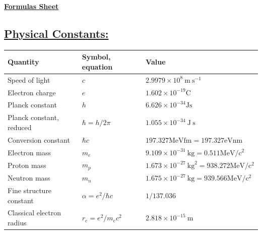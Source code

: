 \documentclass[a4paper,12pt]{article}
\begin{document}
\begin{center}\textbf{\underline{\huge{Formulas Sheet}}}\end{center}

\subsection*{\underline{Physical Constants:}}
\begin{tabular}{lll}
    \hline Quantity                & Symbol, equation                         & Value                                                                          \\
    \hline Speed of light          & $c$                                      & $2.9979 \times 10^{8} \mathrm{~m} \mathrm{~s}^{-1}$                            \\
    Electron charge                & $e$                                      & $1.602 \times 10^{-19} \mathrm{C}$                                             \\
    Planck constant                & $h$                                      & $6.626 \times 10^{-34} \mathrm{Js}$                                            \\
    Planck constant, reduced       & $\hbar=h / 2 \pi$                        & $1.055 \times 10^{-34} \mathrm{~J} \mathrm{~s}$                                \\
    Conversion constant            & $\hbar c$                                & $197.327 \mathrm{MeVfm}=197.327 \mathrm{eVnm}$                                 \\
    \hline Electron mass           & $m_{e}$                                  & $9.109 \times 10^{-31} \mathrm{~kg}=0.511 \mathrm{MeV} / \mathrm{c}^{2}$       \\
    Proton mass                    & $m_{p}$                                  & $1.673 \times 10^{-27} \mathrm{~kg}^{2}=938.272 \mathrm{MeV} / \mathrm{c}^{2}$ \\
    Neutron mass                   & $m_{n}$                                  & $1.675 \times 10^{-27} \mathrm{~kg}=939.566 \mathrm{MeV} / \mathrm{c}^{2}$     \\
    \hline Fine structure constant & $\alpha=e^{2} / \hbar c$                 & $1 / 137.036$                                                                  \\
    Classical electron radius      & $r_{e}=e^{2} / m_{e} c^{2}$              & $2.818 \times 10^{-15} \mathrm{~m}$                                            \\

\end{tabular}
\end{document}
